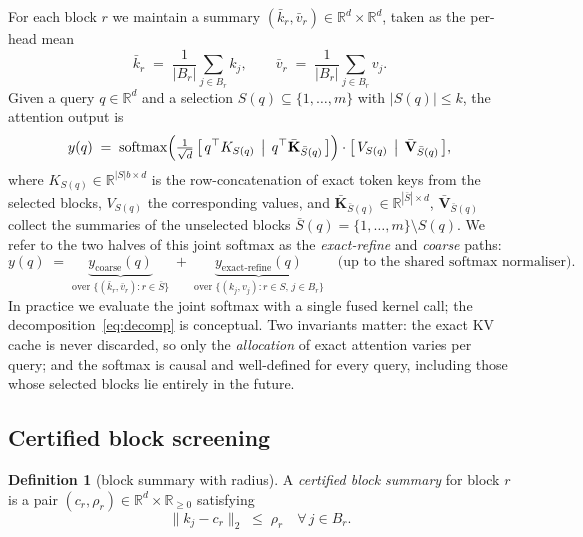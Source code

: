 \documentclass[11pt]{article}
\theoremstyle{plain}
\theoremstyle{definition}
\newtheorem{definition}{Definition}
\newcommand{\R}{\mathbb{R}}
\newcommand{\Kbar}{\bar{\mathbf{K}}}
\newcommand{\Vbar}{\bar{\mathbf{V}}}
\newcommand{\rad}{\rho_r}
\begin{document}
For each block $r$ we maintain a summary $(\bar k_r, \bar v_r) \in \R^{d} \times \R^{d}$,
taken as the per-head mean
\begin{equation}
\bar k_r \;=\; \frac{1}{|B_r|} \sum_{j \in B_r} k_j,
\qquad
\bar v_r \;=\; \frac{1}{|B_r|} \sum_{j \in B_r} v_j. \label{eq:summary}
\end{equation}
Given a query $q \in \R^{d}$ and a selection
$S(q) \subseteq \{1, \dots, m\}$ with $|S(q)| \le k$, the attention output is
\begin{equation}
y(q) \;=\; \mathrm{softmax}\!\left( \tfrac{1}{\sqrt d}\, \bigl[\,q^{\top} K_{S(q)} \,\bigm|\, q^{\top} \Kbar_{\bar S(q)}\,\bigr] \right) \cdot \bigl[\, V_{S(q)} \,\bigm|\, \Vbar_{\bar S(q)} \,\bigr], \label{eq:coarse-exact}
\end{equation}
where $K_{S(q)} \in \R^{|S| b \times d}$ is the row-concatenation of exact
token keys from the selected blocks, $V_{S(q)}$ the corresponding values,
and $\Kbar_{\bar S(q)} \in \R^{|\bar S| \times d}$, $\Vbar_{\bar S(q)}$
collect the summaries of the unselected blocks
$\bar S(q) = \{1,\dots,m\} \setminus S(q)$. We refer to the two halves of
this joint softmax as the \emph{exact-refine} and \emph{coarse} paths:
\begin{equation}
y(q) \;=\; \underbrace{y_{\mathrm{coarse}}(q)}_{\text{over }\{(\bar k_r, \bar v_r) : r \in \bar S\}} \;+\; \underbrace{y_{\mathrm{exact\text{-}refine}}(q)}_{\text{over }\{(k_j, v_j) : r \in S,\, j \in B_r\}}
\quad\text{(up to the shared softmax normaliser).}\label{eq:decomp}
\end{equation}
In practice we evaluate the joint softmax with a single fused kernel
call; the decomposition~\eqref{eq:decomp} is conceptual. Two invariants
matter: the exact KV cache is never discarded, so only the \emph{allocation}
of exact attention varies per query; and the softmax is causal and
well-defined for every query, including those whose selected blocks lie
entirely in the future.

\subsection{Certified block screening}
\label{sec:cert}

\begin{definition}[block summary with radius]
A \emph{certified block summary} for block $r$ is a pair
$(c_r, \rad) \in \R^{d} \times \R_{\ge 0}$ satisfying
\begin{equation}
\|k_j - c_r\|_2 \;\le\; \rad \quad \forall\, j \in B_r. \label{eq:radius-inv}
\end{equation}
\end{definition}
\end{document}
